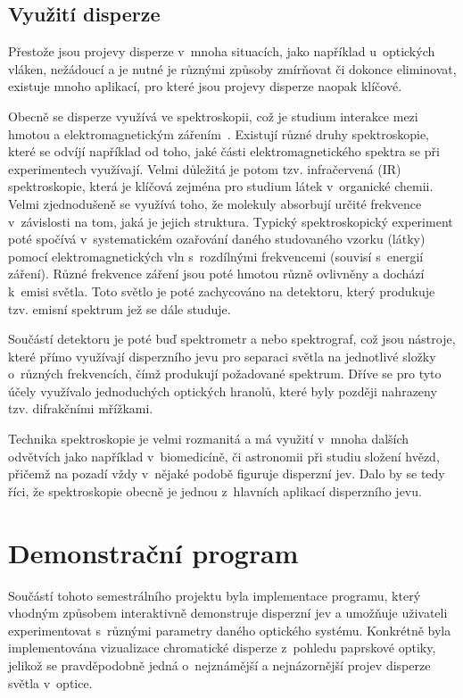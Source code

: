 \subsection{Využití disperze}
Přestože jsou projevy disperze v~mnoha
situacích, jako například u~optických vláken,
nežádoucí a je nutné je různými způsoby
zmírňovat či dokonce eliminovat, existuje
mnoho aplikací, pro které jsou projevy
disperze naopak klíčové.

Obecně se disperze využívá ve spektroskopii,
což je studium interakce mezi hmotou a
elektromagnetickým zářením~\cite{wiki_spectroscopy}.
Existují různé
druhy spektroskopie, které se odvíjí například
od toho, jaké části elektromagnetického spektra
se při experimentech využívají. Velmi důležitá
je potom tzv. infračervená (IR) spektroskopie,
která je klíčová zejména pro studium látek
v~organické chemii. Velmi zjednodušeně se využívá
toho, že molekuly absorbují určité frekvence
v~závislosti na tom, jaká je jejich struktura.
Typický spektroskopický experiment poté spočívá
v~systematickém ozařování daného studovaného
vzorku (látky) pomocí elektromagnetických vln
s~rozdílnými frekvencemi (souvisí s~energií
záření). Různé frekvence záření jsou poté
hmotou různě ovlivněny a dochází k~emisi
světla. Toto světlo je poté zachycováno na
detektoru, který produkuje tzv. emisní spektrum
jež se dále studuje.

Součástí detektoru je poté buď spektrometr
a nebo spektrograf, což jsou nástroje, které
přímo využívají disperzního jevu pro separaci
světla na jednotlivé složky o~různých frekvencích,
čímž produkují požadované spektrum. Dříve se
pro tyto účely využívalo jednoduchých optických
hranolů, které byly později nahrazeny tzv.
difrakčními mřížkami.

Technika spektroskopie je velmi rozmanitá a
má využití v~mnoha dalších odvětvích jako
například v~biomedicíně,
či astronomii při studiu složení hvězd, přičemž
na pozadí vždy v~nějaké podobě figuruje disperzní
jev. Dalo by se tedy říci, že spektroskopie
obecně je jednou z~hlavních aplikací disperzního
jevu.


\section{Demonstrační program}
Součástí tohoto semestrálního projektu
byla implementace programu, který vhodným
způsobem interaktivně demonstruje disperzní
jev a umožňuje uživateli experimentovat
s~různými parametry daného optického systému.
Konkrétně byla implementována vizualizace
chromatické disperze z~pohledu paprskové
optiky, jelikož se pravděpodobně jedná
o~nejznámější a nejnázornější projev disperze
světla v~optice.

